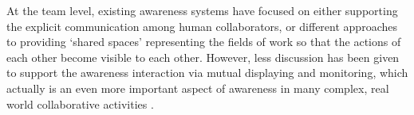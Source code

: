 At the team level, existing awareness systems have focused on either supporting the explicit communication among human collaborators, or different approaches to providing `shared spaces' representing the fields of work so that the actions of each other become visible to each other. However, less discussion has been given to support the awareness interaction via mutual displaying and monitoring, which actually is an even more important aspect of awareness in many complex, real world collaborative activities \cite{heath2002a}.






 

